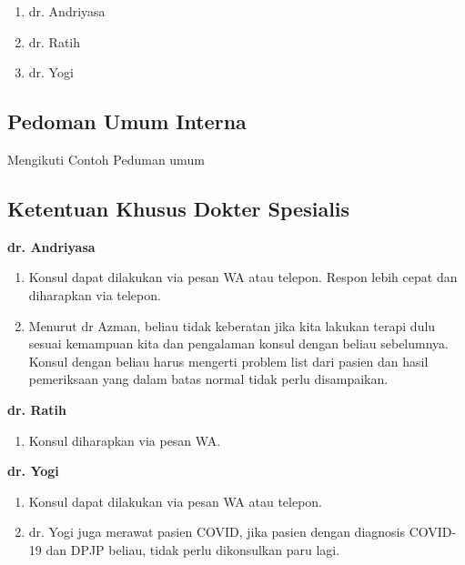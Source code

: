 \documentclass[
]{book}
\providecommand{\tightlist}{%
  \setlength{\itemsep}{0pt}\setlength{\parskip}{0pt}}
\begin{document}
\begin{enumerate}
\def\labelenumi{\arabic{enumi}.}
\tightlist
\item
  dr. Andriyasa
\item
  dr. Ratih
\item
  dr. Yogi
\end{enumerate}

\hypertarget{pedoman-umum-interna}{%
\subsection{Pedoman Umum Interna}\label{pedoman-umum-interna}}

Mengikuti Contoh Peduman umum

\hypertarget{ketentuan-khusus-dokter-spesialis}{%
\subsection{Ketentuan Khusus Dokter Spesialis}\label{ketentuan-khusus-dokter-spesialis}}

\textbf{dr. Andriyasa}

\begin{enumerate}
\def\labelenumi{\arabic{enumi}.}
\tightlist
\item
  Konsul dapat dilakukan via pesan WA atau telepon. Respon lebih cepat dan diharapkan via telepon.
\item
  Menurut dr Azman, beliau tidak keberatan jika kita lakukan terapi dulu sesuai kemampuan kita dan pengalaman konsul dengan beliau sebelumnya.
  Konsul dengan beliau harus mengerti problem list dari pasien dan hasil pemeriksaan yang dalam batas normal tidak perlu disampaikan.
\end{enumerate}

\textbf{dr. Ratih}

\begin{enumerate}
\def\labelenumi{\arabic{enumi}.}
\tightlist
\item
  Konsul diharapkan via pesan WA.
\end{enumerate}

\textbf{dr. Yogi}

\begin{enumerate}
\def\labelenumi{\arabic{enumi}.}
\tightlist
\item
  Konsul dapat dilakukan via pesan WA atau telepon.
\item
  dr. Yogi juga merawat pasien COVID, jika pasien dengan diagnosis COVID-19 dan DPJP beliau, tidak perlu dikonsulkan paru lagi.
\end{enumerate}
\end{document}
